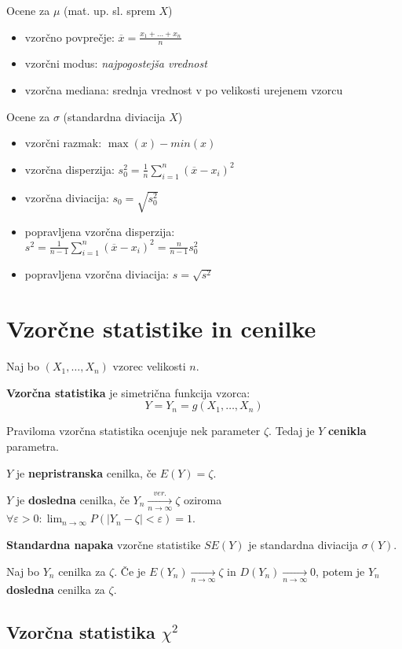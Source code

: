 \begin{multicols}{5}
Ocene za $\mu$ (mat. up. sl. sprem $X$)
\begin{itemize}
    \item vzorčno povprečje: $\overline{x} = \frac{x_1 + \dots + x_n}{n}$
    \item vzorčni modus: \textit{najpogostejša vrednost}
    \item vzorčna mediana: srednja vrednost v po velikosti urejenem vzorcu
\end{itemize}
Ocene za $\sigma$ (standardna diviacija $X$)
\begin{itemize}
    \item vzorčni razmak: $\max(x) - min(x)$
    \item vzorčna disperzija: $s_0^2 = \frac{1}{n} \sum_{i=1}^n (\overline{x} - x_i)^2$
    \item vzorčna diviacija: $s_0 = \sqrt{s_0^2}$
    \item popravljena vzorčna disperzija: \\ $s^2 = \frac{1}{n-1} \sum_{i=1}^n (\overline{x} - x_i)^2 = \frac{n}{n-1} s_0^2$
    \item popravljena vzorčna diviacija: $s = \sqrt{s^2}$
\end{itemize}


\section{Vzorčne statistike in cenilke}
Naj bo $(X_1, \dots, X_n)$ vzorec velikosti $n$.

\textbf{Vzorčna statistika} je simetrična funkcija vzorca:
\[ Y = Y_n = g(X_1, \dots, X_n)\]

Praviloma vzorčna statistika ocenjuje nek parameter $\zeta$. Tedaj je $Y$ \textbf{cenikla} parametra.

$Y$ je \textbf{nepristranska} cenilka, če $E(Y) = \zeta$.

$Y$ je \textbf{dosledna} cenilka, če $Y_n \xrightarrow[n \to \infty]{ver.} \zeta$ oziroma $\forall \varepsilon > 0: \lim_{n\to \infty} P(|Y_n - \zeta| < \varepsilon) = 1$.

\textbf{Standardna napaka} vzorčne statistike $SE(Y)$ je standardna diviacija $\sigma(Y)$.


Naj bo $Y_n$ cenilka za $\zeta$. Če je $E(Y_n) \xrightarrow[n \to \infty]{} \zeta$ in $D(Y_n) \xrightarrow[n \to \infty]{} 0$, potem je $Y_n$ \textbf{dosledna} cenilka za $\zeta$.


\subsection{Vzorčna statistika $\chi^2$}


\end{multicols}
